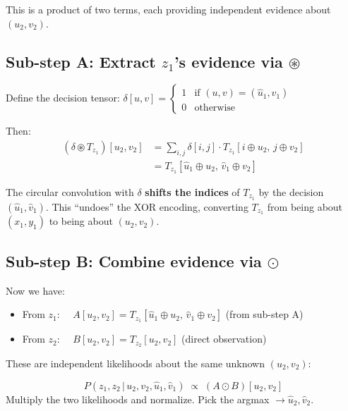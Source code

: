 \documentclass[11pt,a4paper]{article}
\newcommand{\conv}{\circledast}
\newcommand{\nprod}{\odot}
\begin{document}
This is a product of two terms, each providing independent evidence about $(u_2, v_2)$.

\subsection{Sub-step A: Extract $z_1$'s evidence via $\conv$}

Define the decision tensor: $\delta[u,v] = \begin{cases} 1 & \text{if } (u,v) = (\hat{u}_1, \hat{v}_1) \\ 0 & \text{otherwise}\end{cases}$

Then:
\begin{align}
(\delta \conv T_{z_1})[u_2, v_2] &= \sum_{i,j} \delta[i,j] \cdot T_{z_1}[i \oplus u_2,\, j \oplus v_2] \nonumber \\
&= T_{z_1}[\hat{u}_1 \oplus u_2,\, \hat{v}_1 \oplus v_2] \label{eq:shift}
\end{align}

\begin{tcolorbox}[colback=blue!5,colframe=convblue]
The circular convolution with $\delta$ \textbf{shifts the indices} of $T_{z_1}$ by the decision $(\hat{u}_1, \hat{v}_1)$. This ``undoes'' the XOR encoding, converting $T_{z_1}$ from being about $(x_1, y_1)$ to being about $(u_2, v_2)$.
\end{tcolorbox}

\subsection{Sub-step B: Combine evidence via $\nprod$}

Now we have:
\begin{itemize}[nosep]
\item From $z_1$: $\quad A[u_2,v_2] = T_{z_1}[\hat{u}_1 \oplus u_2,\, \hat{v}_1 \oplus v_2]$ \quad (from sub-step A)
\item From $z_2$: $\quad B[u_2,v_2] = T_{z_2}[u_2, v_2]$ \quad (direct observation)
\end{itemize}

These are independent likelihoods about the same unknown $(u_2, v_2)$:

\begin{tcolorbox}[colback=green!5,colframe=prodgreen]
\[
P(z_1, z_2 \,|\, u_2, v_2, \hat{u}_1, \hat{v}_1) \;\propto\; (A \nprod B)[u_2, v_2]
\]
Multiply the two likelihoods and normalize. Pick the argmax $\to \hat{u}_2, \hat{v}_2$.
\end{tcolorbox}
\end{document}
